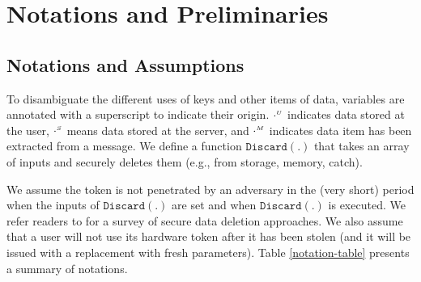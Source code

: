 
\section{Notations and Preliminaries}

 \subsection{Notations and Assumptions}
  
 To disambiguate the different uses of keys and other items of data, variables are annotated with a superscript to indicate their origin. $\cdot^{\scriptscriptstyle U}$ indicates data stored at the user, $\cdot^{\scriptscriptstyle S}$ means data stored at the server, and $\cdot^{\scriptscriptstyle M}$ indicates data item has been extracted from a message. We define a function $\mathtt{Discard}(.)$ that takes an array of inputs and securely deletes them (e.g., from storage, memory, catch). 
 
 We assume the token is not penetrated by an adversary in the (very short) period when the inputs of $\mathtt{Discard}(.)$ are set and when  $\mathtt{Discard}(.)$ is executed. We refer readers to \cite{ReardonBC13} for a survey of secure data deletion approaches. We also assume that a user will not use its hardware token after it has been stolen (and it will be issued with a replacement with fresh parameters). Table \ref{notation-table} presents a summary of notations. 
 
 
 
 
% 
% 
% 
% 
% 
% 
% 
% 
% 
 
